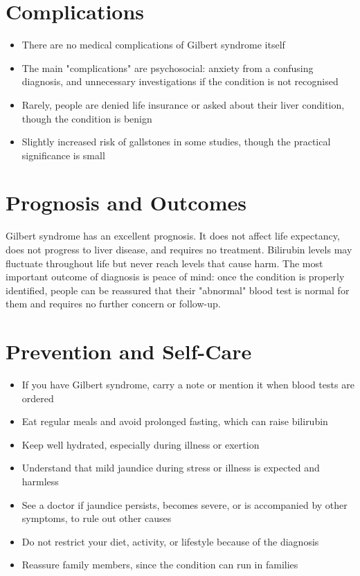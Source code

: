 \section*{Complications}
\begin{itemize}
    \item There are no medical complications of Gilbert syndrome itself
    \item The main "complications" are psychosocial: anxiety from a confusing diagnosis, and unnecessary investigations if the condition is not recognised
    \item Rarely, people are denied life insurance or asked about their liver condition, though the condition is benign
    \item Slightly increased risk of gallstones in some studies, though the practical significance is small
\end{itemize}

\section*{Prognosis and Outcomes}
Gilbert syndrome has an excellent prognosis. It does not affect life expectancy, does not progress to liver disease, and requires no treatment. Bilirubin levels may fluctuate throughout life but never reach levels that cause harm. The most important outcome of diagnosis is peace of mind: once the condition is properly identified, people can be reassured that their "abnormal" blood test is normal for them and requires no further concern or follow-up.

\section*{Prevention and Self-Care}
\begin{itemize}
    \item If you have Gilbert syndrome, carry a note or mention it when blood tests are ordered
    \item Eat regular meals and avoid prolonged fasting, which can raise bilirubin
    \item Keep well hydrated, especially during illness or exertion
    \item Understand that mild jaundice during stress or illness is expected and harmless
    \item See a doctor if jaundice persists, becomes severe, or is accompanied by other symptoms, to rule out other causes
    \item Do not restrict your diet, activity, or lifestyle because of the diagnosis
    \item Reassure family members, since the condition can run in families
\end{itemize}

